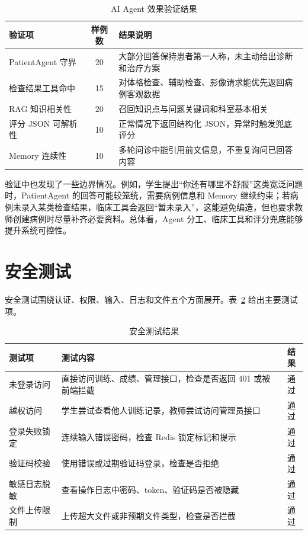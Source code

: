 \begin{table}[H]
    \centering
    \caption{AI Agent 效果验证结果}
    \label{tab:agent_eval}
    \begin{tabularx}{\textwidth}{@{}l c X@{}}
        \toprule
        验证项 & 样例数 & 结果说明 \\
        \midrule
        PatientAgent 守界 & 20 & 大部分回答保持患者第一人称，未主动给出诊断和治疗方案 \\
        检查结果工具命中 & 15 & 对体格检查、辅助检查、影像请求能优先返回病例客观数据 \\
        RAG 知识相关性 & 20 & 召回知识点与问题关键词和科室基本相关 \\
        评分 JSON 可解析性 & 10 & 正常情况下返回结构化 JSON，异常时触发兜底评分 \\
        Memory 连续性 & 10 & 多轮问诊中能引用前文信息，不重复询问已回答内容 \\
        \bottomrule
    \end{tabularx}
\end{table}

验证中也发现了一些边界情况。例如，学生提出“你还有哪里不舒服”这类宽泛问题时，PatientAgent 的回答可能较笼统，需要病例信息和 Memory 继续约束；若病例未录入某类检查结果，临床工具会返回“暂未录入”，这能避免编造，但也要求教师创建病例时尽量补齐必要资料。总体看，Agent 分工、临床工具和评分兜底能够提升系统可控性。

\section{安全测试}

安全测试围绕认证、权限、输入、日志和文件五个方面展开。表~\ref{tab:security_test} 给出主要测试项。

\begin{table}[H]
    \centering
    \caption{安全测试结果}
    \label{tab:security_test}
    \begin{tabular}{lp{6.8cm}c}
        \toprule
        测试项 & 测试内容 & 结果 \\
        \midrule
        未登录访问 & 直接访问训练、成绩、管理接口，检查是否返回 401 或被前端拦截 & 通过 \\
        越权访问 & 学生尝试查看他人训练记录，教师尝试访问管理员接口 & 通过 \\
        登录失败锁定 & 连续输入错误密码，检查 Redis 锁定标记和提示 & 通过 \\
        验证码校验 & 使用错误或过期验证码登录，检查是否拒绝 & 通过 \\
        敏感日志脱敏 & 查看操作日志中密码、token、验证码是否被隐藏 & 通过 \\
        文件上传限制 & 上传超大文件或非预期文件类型，检查是否拦截 & 通过 \\
        \bottomrule
    \end{tabular}
\end{table}

